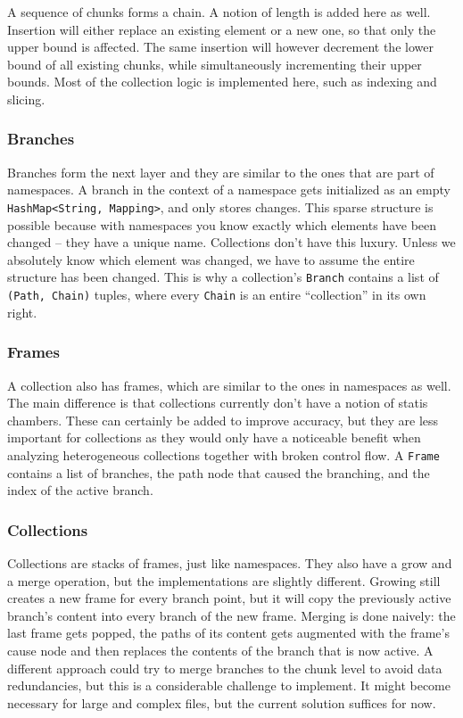\documentclass[a4paper, 16pt, oneside]{Thesis}
\begin{document}
A sequence of chunks forms a chain. A notion of length is added here as
well. Insertion will either replace an existing element or a new one, so
that only the upper bound is affected. The same insertion will however
decrement the lower bound of all existing chunks, while simultaneously
incrementing their upper bounds. Most of the collection logic is
implemented here, such as indexing and slicing.

\subsubsection{Branches}\label{branches}

Branches form the next layer and they are similar to the ones that are
part of namespaces. A branch in the context of a namespace gets
initialized as an empty
\texttt{HashMap\textless{}String,\ Mapping\textgreater{}}, and only
stores changes. This sparse structure is possible because with
namespaces you know exactly which elements have been changed -- they
have a unique name. Collections don't have this luxury. Unless we
absolutely know which element was changed, we have to assume the entire
structure has been changed. This is why a collection's \texttt{Branch}
contains a list of \texttt{(Path,\ Chain)} tuples, where every
\texttt{Chain} is an entire ``collection'' in its own right.

\subsubsection{Frames}\label{frames}

A collection also has frames, which are similar to the ones in
namespaces as well. The main difference is that collections currently
don't have a notion of statis chambers. These can certainly be added to
improve accuracy, but they are less important for collections as they
would only have a noticeable benefit when analyzing heterogeneous
collections together with broken control flow. A \texttt{Frame} contains
a list of branches, the path node that caused the branching, and the
index of the active branch.

\subsubsection{Collections}\label{collections-1}

Collections are stacks of frames, just like namespaces. They also have a
grow and a merge operation, but the implementations are slightly
different. Growing still creates a new frame for every branch point, but
it will copy the previously active branch's content into every branch of
the new frame. Merging is done naively: the last frame gets popped, the
paths of its content gets augmented with the frame's cause node and then
replaces the contents of the branch that is now active. A different
approach could try to merge branches to the chunk level to avoid data
redundancies, but this is a considerable challenge to implement. It
might become necessary for large and complex files, but the current
solution suffices for now.
\end{document}
